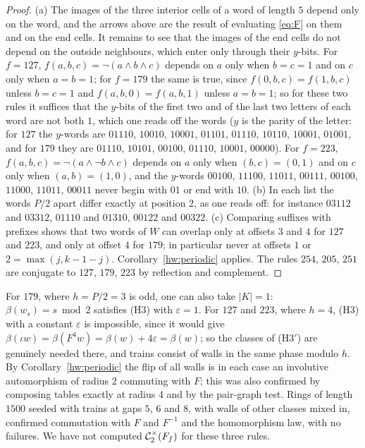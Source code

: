\begin{proof}
(a) The images of the three interior cells of a word of length $5$ depend only on the word, and the arrows above are the result of evaluating \eqref{eq:F} on them and on the end cells. It remains to see that the images of the end cells do not depend on the outside neighbours, which enter only through their $y$-bits. For $f=127$, $f(a,b,c)=\lnot(a\land b\land c)$ depends on $a$ only when $b=c=1$ and on $c$ only when $a=b=1$; for $f=179$ the same is true, since $f(0,b,c)=f(1,b,c)$ unless $b=c=1$ and $f(a,b,0)=f(a,b,1)$ unless $a=b=1$; so for these two rules it suffices that the $y$-bits of the first two and of the last two letters of each word are not both $1$, which one reads off the words ($y$ is the parity of the letter: for $127$ the $y$-words are $01110$, $10010$, $10001$, $01101$, $01110$, $10110$, $10001$, $01001$, and for $179$ they are $01110$, $10101$, $00100$, $01110$, $10001$, $00000$). For $f=223$, $f(a,b,c)=\lnot(a\land\lnot b\land c)$ depends on $a$ only when $(b,c)=(0,1)$ and on $c$ only when $(a,b)=(1,0)$, and the $y$-words $00100$, $11100$, $11011$, $00111$, $00100$, $11000$, $11011$, $00011$ never begin with $01$ or end with $10$.
(b) In each list the words $P/2$ apart differ exactly at position $2$, as one reads off: for instance $03112$ and $03312$, $01110$ and $01310$, $00122$ and $00322$.
(c) Comparing suffixes with prefixes shows that two words of $W$ can overlap only at offsets $3$ and $4$ for $127$ and $223$, and only at offset $4$ for $179$; in particular never at offsets $1$ or $2=\max(j,k-1-j)$.
Corollary~\ref{hw:periodic} applies. The rules $254$, $205$, $251$ are conjugate to $127$, $179$, $223$ by reflection and complement.
\end{proof}

For $179$, where $h=P/2=3$ is odd, one can also take $|K|=1$: $\beta(w_s)=s\bmod2$ satisfies (H3) with $\varepsilon=1$. For $127$ and $223$, where $h=4$, (H3) with a constant $\varepsilon$ is impossible, since it would give $\beta(\iota w)=\beta(F^4w)=\beta(w)+4\varepsilon=\beta(w)$; so the classes of (H3$'$) are genuinely needed there, and trains consist of walls in the same phase modulo $h$. By Corollary~\ref{hw:periodic} the flip of all walls is in each case an involutive automorphism of radius $2$ commuting with $F$; this was also confirmed by composing tables exactly at radius $4$ and by the pair-graph test. Rings of length $1500$ seeded with trains at gaps $5$, $6$ and $8$, with walls of other classes mixed in, confirmed commutation with $F$ and $F^{-1}$ and the homomorphism law, with no failures. We have not computed $\mathcal{C}^{\times}_2(F_f)$ for these three rules.

